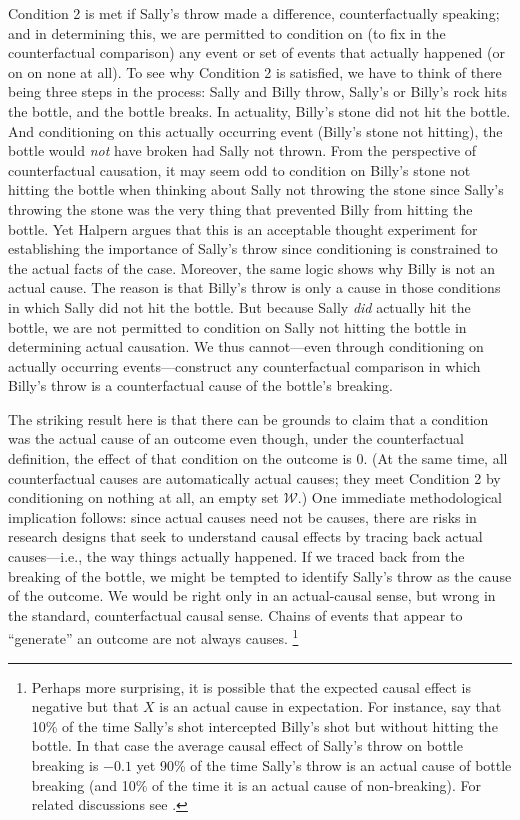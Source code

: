\documentclass[
  12pt,
]{book}
\begin{document}
Condition 2 is met if Sally's throw made a difference, counterfactually speaking; and in determining this, we are permitted to condition on (to fix in the counterfactual comparison) any event or set of events that actually happened (or on on none at all). To see why Condition 2 is satisfied, we have to think of there being three steps in the process: Sally and Billy throw, Sally's or Billy's rock hits the bottle, and the bottle breaks. In actuality, Billy's stone did not hit the bottle. And conditioning on this actually occurring event (Billy's stone not hitting), the bottle would \emph{not} have broken had Sally not thrown. From the perspective of counterfactual causation, it may seem odd to condition on Billy's stone not hitting the bottle when thinking about Sally not throwing the stone since Sally's throwing the stone was the very thing that prevented Billy from hitting the bottle. Yet Halpern argues that this is an acceptable thought experiment for establishing the importance of Sally's throw since conditioning is constrained to the actual facts of the case. Moreover, the same logic shows why Billy is not an actual cause. The reason is that Billy's throw is only a cause in those conditions in which Sally did not hit the bottle. But because Sally \emph{did} actually hit the bottle, we are not permitted to condition on Sally not hitting the bottle in determining actual causation. We thus cannot---even through conditioning on actually occurring events---construct any counterfactual comparison in which Billy's throw is a counterfactual cause of the bottle's breaking.

The striking result here is that there can be grounds to claim that a condition was the actual cause of an outcome even though, under the counterfactual definition, the effect of that condition on the outcome is 0. (At the same time, all counterfactual causes are automatically actual causes; they meet Condition 2 by conditioning on nothing at all, an empty set \(\mathcal W\).) One immediate methodological implication follows: since actual causes need not be causes, there are risks in research designs that seek to understand causal effects by tracing back actual causes---i.e., the way things actually happened. If we traced back from the breaking of the bottle, we might be tempted to identify Sally's throw as the cause of the outcome. We would be right only in an actual-causal sense, but wrong in the standard, counterfactual causal sense. Chains of events that appear to ``generate'' an outcome are not always causes. \footnote{Perhaps more surprising, it is possible that the expected causal effect is negative but that \(X\) is an actual cause in expectation. For instance, say that 10\% of the time Sally's shot intercepted Billy's shot but without hitting the bottle. In that case the average causal effect of Sally's throw on bottle breaking is \(-0.1\) yet 90\% of the time Sally's throw is an actual cause of bottle breaking (and 10\% of the time it is an actual cause of non-breaking). For related discussions see \citet{menzies1989probabilistic}.}
\end{document}
